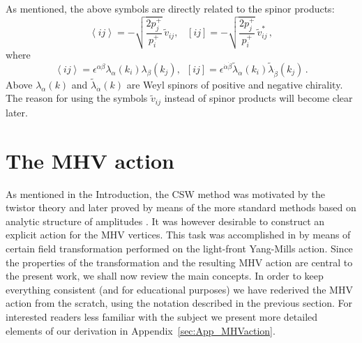 \documentclass[english,american]{article}
\begin{document}
As mentioned, the above symbols are directly related to the spinor
products:
\begin{equation}
\left\langle ij\right\rangle =-\sqrt{\frac{2p_{j}^{+}}{p_{i}^{+}}}\,\tilde{v}_{ij},\;\;\;\left[ij\right]=-\sqrt{\frac{2p_{j}^{+}}{p_{i}^{+}}}\,\tilde{v}_{ij}^{*}\,,\label{eq:spinor_prod}
\end{equation}
where
\begin{equation}
\left\langle ij\right\rangle =\epsilon^{\alpha\beta}\lambda_{\alpha}\left(k_{i}\right)\lambda_{\beta}\left(k_{j}\right),\,\,\,\left[ij\right]=\epsilon^{\dot{\alpha}\dot{\beta}}\tilde{\lambda}_{\dot{\alpha}}\left(k_{i}\right)\tilde{\lambda}_{\dot{\beta}}\left(k_{j}\right)\,.
\end{equation}
Above $\lambda_{\alpha}\left(k\right)$ and $\tilde{\lambda}_{\dot{\alpha}}\left(k\right)$
are Weyl spinors of positive and negative chirality. The reason for
using the symbols $\tilde{v}_{ij}$ instead of spinor products will
become clear later.

\section{The MHV action}

\label{sec:MHV_action}

As mentioned in the Introduction, the CSW method \citep{Cachazo2004}
was motivated by the twistor theory and later proved by means of the
more standard methods based on analytic structure of amplitudes \citep{Britto:2005fq,Risager2005}.
It was however desirable to construct an explicit action for the MHV
vertices. This task was accomplished in \citep{Mansfield2006} by
means of certain field transformation performed on the light-front
Yang-Mills action. Since the properties of the transformation and
the resulting MHV action are central to the present work, we shall
now review the main concepts. In order to keep everything consistent
(and for educational purposes) we have rederived the MHV action from
the scratch, using the notation described in the previous section.
For interested readers less familiar with the subject we present more
detailed elements of our derivation in Appendix~\ref{sec:App_MHVaction}.
\end{document}

